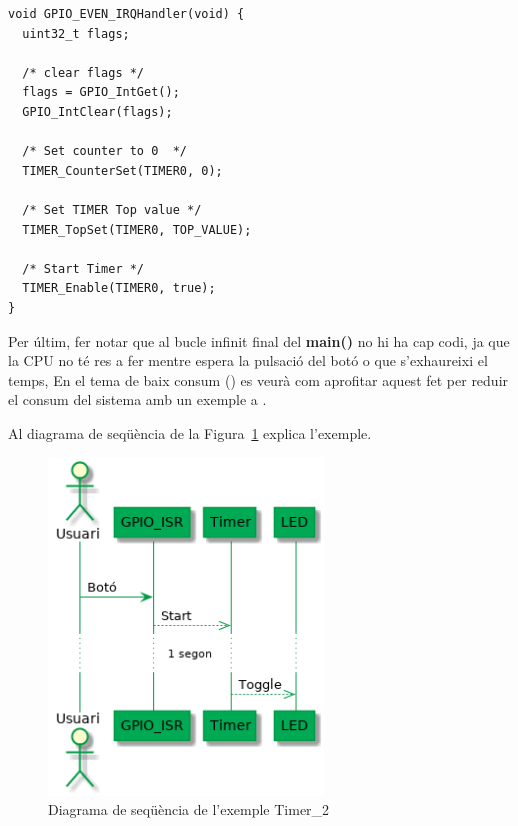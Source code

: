 \begin{lstlisting}[style=customc, label=GPIO_ISR_Timer, caption=ISR del GPIO per l'exemple del Timer]
void GPIO_EVEN_IRQHandler(void) {
  uint32_t flags;

  /* clear flags */
  flags = GPIO_IntGet();
  GPIO_IntClear(flags);

  /* Set counter to 0  */
  TIMER_CounterSet(TIMER0, 0);

  /* Set TIMER Top value */
  TIMER_TopSet(TIMER0, TOP_VALUE);

  /* Start Timer */
  TIMER_Enable(TIMER0, true);
}
\end{lstlisting}

Per últim, fer notar que al bucle infinit final del {\bf main()} no hi ha cap codi, ja que la \gls{CPU} no té res a fer mentre espera la pulsació del botó o que s'exhaureixi el temps, En el tema de baix consum () es veurà com aprofitar aquest fet per reduir el consum del sistema amb un exemple a .

Al diagrama de seqüència de  la Figura~\ref{fig:TImer_2seq} explica l'exemple.

\begin{figure}
 \centering
 \includegraphics[width=0.65\textwidth, keepaspectratio]{imatges/Timer2Seq.png}
 \caption{Diagrama de seqüència de l'exemple Timer\_2}
 \label{fig:TImer_2seq}
\end{figure}

